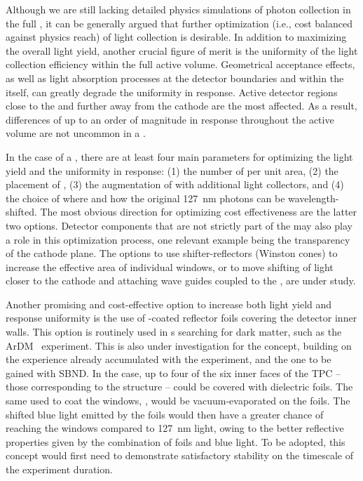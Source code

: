 Although we are still lacking detailed physics simulations of photon collection in the full  , it can be generally argued that further optimization (i.e., cost 
balanced against physics reach) of light collection is desirable. In addition to  maximizing the overall light yield, another crucial figure of merit is the uniformity of the light collection efficiency within the full  active volume. Geometrical acceptance effects, as well as light absorption processes at the detector boundaries and within the \lar itself, can greatly degrade the uniformity in response. Active detector regions close to the  and further away from the cathode are the most %
affected. As a result, differences of up to an order of magnitude in response throughout the %
active volume are not uncommon in a \lartpc.

In the case of a \lartpc, there are at least four main parameters for optimizing the light yield and the uniformity in response: (1) the number of  per unit area, (2) the placement of , (3) the augmentation of  with additional light collectors, and (4) the choice of where and how the original \SI{127}{nm} photons can be wavelength-shifted. The most obvious direction for optimizing cost effectiveness are the latter two options. Detector components that are not strictly part of the  may also play a role in this optimization process, one relevant example being the transparency of the cathode plane. The options to use shifter-reflectors (Winston cones) to increase the effective area of individual  windows, or to move shifting of light closer to the cathode and attaching wave guides coupled to the , are under study.

Another promising and cost-effective option to increase both light yield and response uniformity is the use of -coated reflector foils covering the detector inner walls. This option is routinely used in \dual \lartpc{}s searching for dark matter, such as the ArDM~\cite{Boccone:2009zz} experiment. 
This is also under investigation for the  concept, building on the experience already accumulated with the \lariat experiment, and the one to be gained with SBND. In the \dual case, up to four of the six inner faces of the TPC -- those corresponding to the  structure -- could be covered with dielectric foils. The same  used to coat the  windows, , would be vacuum-evaporated on the foils. The shifted blue light emitted by the foils would then have a greater chance of reaching the  windows compared to \SI{127}{nm} light, owing to the better reflective properties given by the combination of foils and blue light. To be adopted, %
this concept would first need to demonstrate satisfactory stability on the timescale of the experiment duration.


